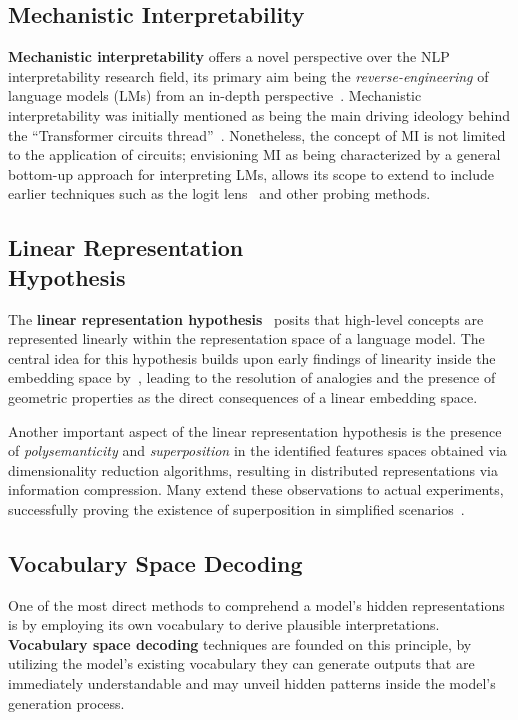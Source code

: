 \documentclass[11pt,a4paper,twocolumn]{article}
\begin{document}
\subsection{Mechanistic Interpretability}

\textbf{Mechanistic interpretability} offers a novel perspective over the NLP interpretability research field, its primary aim being the \emph{reverse-engineering} of language models (LMs) from an in-depth perspective~\cite{olah2022}.
Mechanistic interpretability was initially mentioned as being the main driving ideology behind the ``Transformer circuits thread''~\cite{elhage2023}.
Nonetheless, the concept of MI is not limited to the application of circuits; envisioning MI as being characterized by a general bottom-up approach for interpreting LMs, allows its scope to extend to include earlier techniques such as the logit lens~\cite{nostalgebraist2020} and other probing methods.

\subsection{Linear Representation \texorpdfstring{ \\ }{} Hypothesis}

The \textbf{linear representation hypothesis}~\cite{park2023} posits that high-level concepts are represented linearly within the representation space of a language model.
The central idea for this hypothesis builds upon early findings of linearity inside the embedding space by~\citet{mikolov2013}, leading to the resolution of analogies and the presence of geometric properties as the direct consequences of a linear embedding space.

Another important aspect of the linear representation hypothesis is the presence of \emph{polysemanticity} and \emph{superposition} in the identified features spaces obtained via dimensionality reduction algorithms, resulting in distributed representations via information compression.
Many extend these observations to actual experiments, successfully proving the existence of superposition in simplified scenarios~\cite{elhage2022}.

\subsection{Vocabulary Space Decoding}

One of the most direct methods to comprehend a model's hidden representations is by employing its own vocabulary to derive plausible interpretations.
\textbf{Vocabulary space decoding} techniques are founded on this principle, by utilizing the model's existing vocabulary they can generate outputs that are immediately understandable and may unveil hidden patterns inside the model's generation process.
\end{document}
